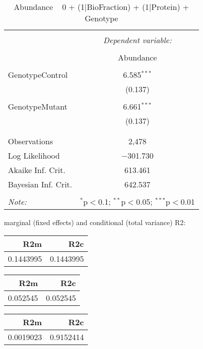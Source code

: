 \documentclass[11pt]{report}
\begin{document}
\begin{table}[!htbp] \centering 
  \caption{Abundance ~ 0 + (1|BioFraction) + (1|Protein) + Genotype} 
  \label{} 
\begin{tabular}{@{\extracolsep{5pt}}lc} 
\\[-1.8ex]\hline 
\hline \\[-1.8ex] 
 & \multicolumn{1}{c}{\textit{Dependent variable:}} \\ 
\cline{2-2} 
\\[-1.8ex] & Abundance \\ 
\hline \\[-1.8ex] 
 GenotypeControl & 6.585$^{***}$ \\ 
  & (0.137) \\ 
  & \\ 
 GenotypeMutant & 6.661$^{***}$ \\ 
  & (0.137) \\ 
  & \\ 
\hline \\[-1.8ex] 
Observations & 2,478 \\ 
Log Likelihood & $-$301.730 \\ 
Akaike Inf. Crit. & 613.461 \\ 
Bayesian Inf. Crit. & 642.537 \\ 
\hline 
\hline \\[-1.8ex] 
\textit{Note:}  & \multicolumn{1}{r}{$^{*}$p$<$0.1; $^{**}$p$<$0.05; $^{***}$p$<$0.01} \\ 
\end{tabular} 
\end{table} 
marginal (fixed effects) and conditional (total variance) R2:

\begin{tabular}{r|r}
\hline
R2m & R2c\\
\hline
0.1443995 & 0.1443995\\
\hline
\end{tabular}

\begin{tabular}{r|r}
\hline
R2m & R2c\\
\hline
0.052545 & 0.052545\\
\hline
\end{tabular}

\begin{tabular}{r|r}
\hline
R2m & R2c\\
\hline
0.0019023 & 0.9152414\\
\hline
\end{tabular}
\end{document}
